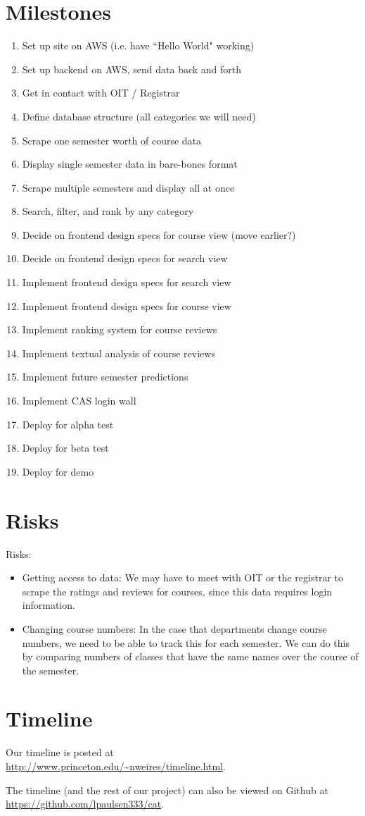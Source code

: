 \documentclass[11pt]{article}
\begin{document}
\section{Milestones}
\begin{enumerate}
\item Set up site on AWS (i.e. have ``Hello World" working)
\item Set up backend on AWS, send data back and forth
\item Get in contact with OIT / Registrar
\item Define database structure (all categories we will need)
\item Scrape one semester worth of course data
\item Display single semester data in bare-bones format
\item Scrape multiple semesters and display all at once
\item Search, filter, and rank by any category
\item Decide on frontend design specs for course view (move earlier?)
\item Decide on frontend design specs for search view
\par [No particular order from here on out]
\item Implement frontend design specs for search view
\item Implement frontend design specs for course view
\item Implement ranking system for course reviews
\item Implement textual analysis of course reviews
\item Implement future semester predictions
\item Implement CAS login wall
\item Deploy for alpha test
\item Deploy for beta test
\item Deploy for demo
\end{enumerate}

\section{Risks}
Risks:
\begin{itemize}
\item Getting access to data: We may have to meet with OIT or the registrar to scrape the ratings and reviews for courses, since this data requires login information.
\item Changing course numbers: In the case that departments change course numbers, we need to be able to track this for each semester. We can do this by comparing numbers of classes that have the same names over the course of the semester.
\end{itemize}

\section{Timeline}
\par Our timeline is posted at \\
\url{http://www.princeton.edu/~nweires/timeline.html}.
\par The timeline (and the rest of our project) can also be viewed on Github at \\
\url{https://github.com/lpaulsen333/cat}.
\end{document}
